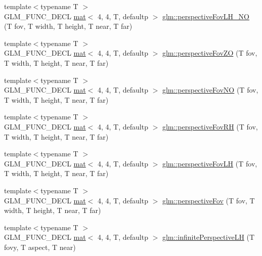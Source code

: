 \begin{DoxyCompactItemize}
\item 
{\footnotesize template$<$typename T $>$ }\\G\+L\+M\+\_\+\+F\+U\+N\+C\+\_\+\+D\+E\+CL \hyperlink{structglm_1_1mat}{mat}$<$ 4, 4, T, defaultp $>$ \hyperlink{group__gtc__matrix__transform_gad18a4495b77530317327e8d466488c1a}{glm\+::perspective\+Fov\+L\+H\+\_\+\+NO} (T fov, T width, T height, T near, T far)
\item 
{\footnotesize template$<$typename T $>$ }\\G\+L\+M\+\_\+\+F\+U\+N\+C\+\_\+\+D\+E\+CL \hyperlink{structglm_1_1mat}{mat}$<$ 4, 4, T, defaultp $>$ \hyperlink{group__gtc__matrix__transform_ga4bc69fa1d1f95128430aa3d2a712390b}{glm\+::perspective\+Fov\+ZO} (T fov, T width, T height, T near, T far)
\item 
{\footnotesize template$<$typename T $>$ }\\G\+L\+M\+\_\+\+F\+U\+N\+C\+\_\+\+D\+E\+CL \hyperlink{structglm_1_1mat}{mat}$<$ 4, 4, T, defaultp $>$ \hyperlink{group__gtc__matrix__transform_gaf30e7bd3b1387a6776433dd5383e6633}{glm\+::perspective\+Fov\+NO} (T fov, T width, T height, T near, T far)
\item 
{\footnotesize template$<$typename T $>$ }\\G\+L\+M\+\_\+\+F\+U\+N\+C\+\_\+\+D\+E\+CL \hyperlink{structglm_1_1mat}{mat}$<$ 4, 4, T, defaultp $>$ \hyperlink{group__gtc__matrix__transform_gaf32bf563f28379c68554a44ee60c6a85}{glm\+::perspective\+Fov\+RH} (T fov, T width, T height, T near, T far)
\item 
{\footnotesize template$<$typename T $>$ }\\G\+L\+M\+\_\+\+F\+U\+N\+C\+\_\+\+D\+E\+CL \hyperlink{structglm_1_1mat}{mat}$<$ 4, 4, T, defaultp $>$ \hyperlink{group__gtc__matrix__transform_ga6aebe16c164bd8e52554cbe0304ef4aa}{glm\+::perspective\+Fov\+LH} (T fov, T width, T height, T near, T far)
\item 
{\footnotesize template$<$typename T $>$ }\\G\+L\+M\+\_\+\+F\+U\+N\+C\+\_\+\+D\+E\+CL \hyperlink{structglm_1_1mat}{mat}$<$ 4, 4, T, defaultp $>$ \hyperlink{group__gtc__matrix__transform_gaebd02240fd36e85ad754f02ddd9a560d}{glm\+::perspective\+Fov} (T fov, T width, T height, T near, T far)
\item 
{\footnotesize template$<$typename T $>$ }\\G\+L\+M\+\_\+\+F\+U\+N\+C\+\_\+\+D\+E\+CL \hyperlink{structglm_1_1mat}{mat}$<$ 4, 4, T, defaultp $>$ \hyperlink{group__gtc__matrix__transform_ga3201b30f5b3ea0f933246d87bfb992a9}{glm\+::infinite\+Perspective\+LH} (T fovy, T aspect, T near)

\end{DoxyCompactItemize}
